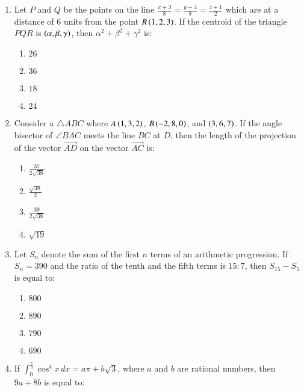 \documentclass[journal]{IEEEtran}
\begin{document}
\begin{enumerate}
{\begin{multicols}{4}
\begin{enumerate}
\item $5$
\item $9$
\item $7$
\end{enumerate}
\end{multicols}
}
\item{
Let $P$ and $Q$ be the points on the line $\frac{x+3}{8}=\frac{y-4}{8}=\frac{z+1}{2}$ which are at a distance of $6$ units from the point $R\left(1,2,3\right)$. If the centroid of the triangle $PQR$ is $\left(\alpha,\beta,\gamma\right)$, then $\alpha^2+\beta^2+\gamma^2$ is:
\begin{multicols}{4}
\begin{enumerate}
\item $26$
\item $36$
\item $18$
\item $24$
\end{enumerate}
\end{multicols}
}
\item{
Consider a $\triangle ABC$ where $A\left(1,3,2\right)$, $B\left(-2,8,0\right)$, and $\left(3,6,7\right)$. If the angle bisector of $\angle BAC$ meets the line $BC$ at $D$, then the length of the projection of the vector $\overrightarrow{AD}$ on the vector $\overrightarrow{AC}$ is:
\begin{multicols}{4}
\begin{enumerate}
\item $\frac{37}{2\sqrt{38}}$
\item $\frac{\sqrt{38}}{2}$
\item $\frac{39}{2\sqrt{38}}$
\item $\sqrt{19}$
\end{enumerate}
\end{multicols}
}
\item{
Let $S_n$ denote the sum of the first $n$ terms of an arithmetic progression. If $S_n=390$ and the ratio of the tenth and the fifth terms is $15:7$, then $S_{15}-S_5$ is equal to:
\begin{multicols}{4}
\begin{enumerate}
\item $800$
\item $890$
\item $790$
\item $690$
\end{enumerate}
\end{multicols}
}
\item{
If $\int_{0}^{\frac{\pi}{3}}\cos^4x\,dx=a\pi+b\sqrt{3}$, where $a$ and $b$ are rational numbers, then $9a+8b$ is equal to:
}
\end{enumerate}
\end{document}
